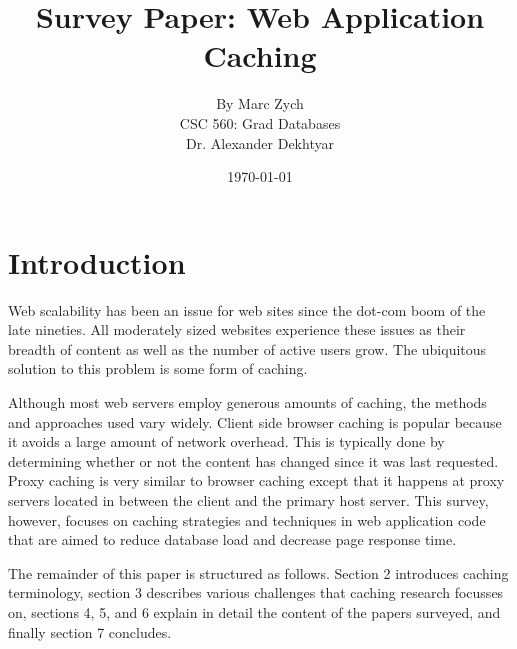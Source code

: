 \documentclass[12pt]{article}
\begin{document}
\title{\vfill Survey Paper: Web Application Caching}

\author{
By Marc Zych \vspace{10pt} \\
CSC 560: Grad Databases \vspace{10pt} \\
Dr. Alexander Dekhtyar \vspace{10pt} \\
}
\date{\today}

\maketitle


\thispagestyle{empty}
\newpage



\section{Introduction}
Web scalability has been an issue for web sites since the dot-com boom of the late nineties.
All moderately sized websites experience these issues as their breadth of content as well as the number of active users grow.
The ubiquitous solution to this problem is some form of caching.

Although most web servers employ generous amounts of caching, the methods and approaches used vary widely.
Client side browser caching is popular because it avoids a large amount of network overhead.
This is typically done by determining whether or not the content has changed since it was last requested.
Proxy caching is very similar to browser caching except that it happens at proxy servers located in between the client and the primary host server.
This survey, however, focuses on caching strategies and techniques in web application code that are aimed to reduce database load and decrease page response time.

The remainder of this paper is structured as follows.
Section 2 introduces caching terminology, section 3 describes various challenges that caching research focusses on, sections 4, 5, and 6 explain in detail the content of the papers surveyed, and finally section 7 concludes.
\end{document}
